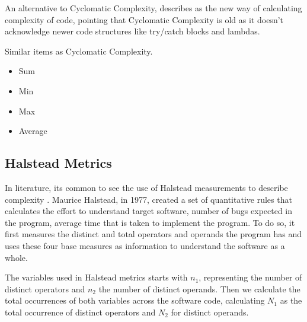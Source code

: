 An alternative to Cyclomatic Complexity, \cite{article:sonarpaper} describes as the new way of calculating complexity of code,
pointing that Cyclomatic Complexity is old as it doesn't acknowledge newer code structures like try/catch blocks and lambdas.

Similar items as Cyclomatic Complexity.

\begin{itemize}
  \item Sum 
  \item Min 
  \item Max 
  \item Average 
\end{itemize}

\subsection{Halstead Metrics}

In literature, its common to see the use of Halstead measurements to describe complexity
\cite{article:complexity_with_halstead}.
Maurice Halstead, in 1977, created a set of quantitative rules that calculates the effort to understand target software,
number of bugs expected in the program, average time that is taken to implement the program.
To do so, it first measures the distinct and total operators and operands the program has and uses these four base
measures as information to understand the software as a whole.

The variables used in Halstead metrics starts with $n_{1}$, representing the number of distinct operators and $n_{2}$ the
number of distinct operands. Then we calculate the total occurrences of both variables across the software code, calculating
$N_{1}$ as the total occurrence of distinct operators and $N_{2}$ for distinct operands.

